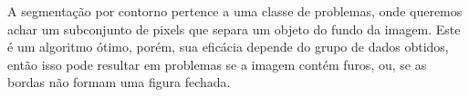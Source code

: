 \begin{question}
    A segmentação por contorno pertence a uma classe de problemas, onde queremos achar 
    um subconjunto de pixels que separa um objeto do fundo da imagem. Este é um algoritmo 
    ótimo, porém, sua eficácia depende do grupo de dados obtidos, então isso pode resultar
    em problemas se a imagem contém furos, ou, se as bordas não formam uma figura fechada.
\end{question}